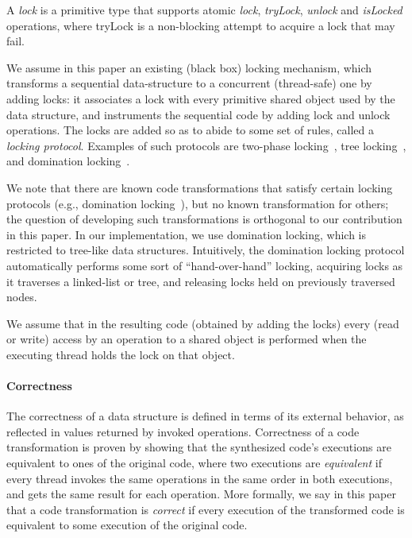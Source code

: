 A \emph{lock} is a primitive type that supports atomic \emph{lock},
\emph{tryLock}, \emph{unlock} and \emph{isLocked} operations, where tryLock is a
non-blocking attempt to acquire a lock that may fail.

We assume in this paper an existing (black box) locking mechanism, which transforms a sequential data-structure to a concurrent (thread-safe)
one by adding locks:
it associates a lock with every primitive shared object used by the data structure, and instruments the sequential code
by adding lock and unlock operations.
The locks are added so as to abide to some set of rules, called a \emph{locking protocol}.
Examples of such protocols are two-phase locking~\cite{Eswaran:1976}, tree locking~\cite{SilberschatzK1980}, and domination locking~\cite{Gueta2011}.

We note that there are known code transformations that satisfy certain locking protocols (e.g., domination locking~\cite{Gueta2011}), but no known
transformation for others; the question of developing such transformations is orthogonal to our contribution in this paper.
In our implementation, we use domination locking, which is restricted to tree-like data structures.
Intuitively, the domination locking protocol automatically performs some sort of ``hand-over-hand'' locking, acquiring locks as
it traverses a linked-list or tree, and releasing locks held on previously traversed nodes.

We assume that in the resulting code (obtained by adding the locks) every (read
or write) access by an operation to a shared object is performed when the
executing thread holds the lock on that object.


\paragraph{Correctness}

The correctness of a data structure is defined in terms of its external behavior, as reflected in values returned by invoked operations.
Correctness of a code transformation is proven by showing that the synthesized code's executions are equivalent to ones of the original code,
where two executions are  \emph{equivalent} if every thread invokes the same
operations in the same order  in both executions, and gets the same result for each operation. More formally, we say in this paper that a code transformation is \emph{correct} if every execution of the transformed code
is equivalent to some execution of the original code.

